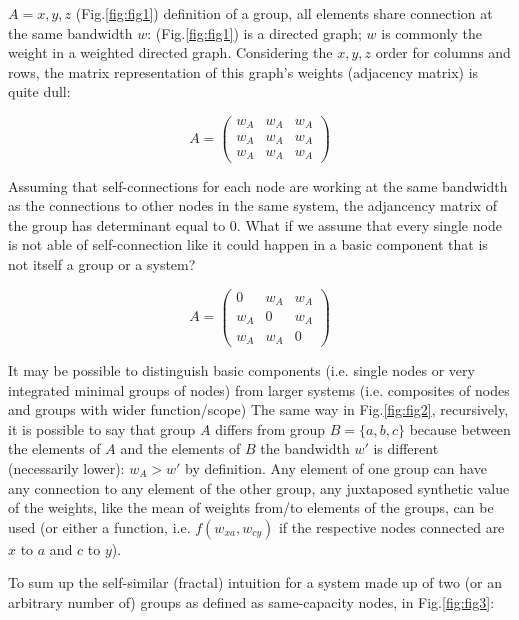 \documentclass[14pt]{extarticle}
\begin{document}
\(A = { x, y, z }\) (Fig.\ref{fig:fig1})
definition of a group, all elements share connection at the same bandwidth \(w\): (Fig.\ref{fig:fig1}) is a directed graph; \(w\) is commonly the weight in a weighted directed graph. Considering the \(x, y, z\) order for columns and rows, the matrix representation of this graph's weights (adjacency matrix) is quite dull:

\[%
A = \begin{pmatrix}%
w_A&w_A&w_A\\%
w_A&w_A&w_A\\%
w_A&w_A&w_A%
\end{pmatrix}%
\]

Assuming that self-connections for each node are working at the same bandwidth as the connections to other nodes in the same system, the adjancency matrix of the group has determinant equal to 0. What if we assume that every single node is not able of self-connection like it could happen in a basic component that is not itself a group or a system?

\[%
A = \begin{pmatrix}%
0&w_A&w_A\\%
w_A&0&w_A\\%
w_A&w_A&0%
\end{pmatrix}%
\]

It may be possible to distinguish basic components (i.e. single nodes or very integrated minimal groups of nodes) from larger systems (i.e. composites of nodes and groups with wider function/scope)
\newline
\hspace*{15mm}The same way in Fig.\ref{fig:fig2}, recursively, it is possible to say that group \(A\) differs from group \(B = \{a, b, c\}\) because between the elements of \(A\) and the elements of \(B\) the bandwidth \(w'\) is different (necessarily lower): \(w_A > w'\) by definition. Any element of one group can have any connection to any element of the other group, any juxtaposed synthetic value of the weights, like the mean of weights from/to elements of the groups, can be used (or either a function, i.e. \(f(w_{xa}, w_{cy})\) if the respective nodes connected are \(x\) to \(a\) and \(c\) to \(y\)).

To sum up the self-similar (fractal) intuition for a system made up of two (or an arbitrary number of) groups as defined as same-capacity nodes, in Fig.\ref{fig:fig3}:
\end{document}
